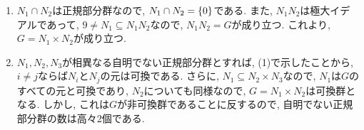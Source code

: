 \documentclass[dvipdfmx]{jsarticle}
\begin{document}
    \begin{enumerate}
        \item $N_1\cap N_2$は正規部分群なので, $N_1 \cap N_2 = \{0\}$である.
        また, $N_1N_2$は極大イデアルであって, $9 \neq N_1 \subseteq N_1N_2$なので,
        $N_1N_2 = G$が成り立つ.
        これより,
        $G = N_1 \times N_2$が成り立つ.
        \item $N_1, N_2, N_3$が相異なる自明でない正規部分群とすれば, (1)で示したことから,
        $i \neq j$ならば$N_i$と$N_j$の元は可換である.
        さらに, $N_1 \subseteq N_2 \times N_3$なので, $N_1$は$G$のすべての元と可換であり,
        $N_2$についても同様なので,
        $G = N_1 \times N_2$は可換群となる.
        しかし, これは$G$が非可換群であることに反するので,
        自明でない正規部分群の数は高々2個である.
    \end{enumerate}
\end{document}
